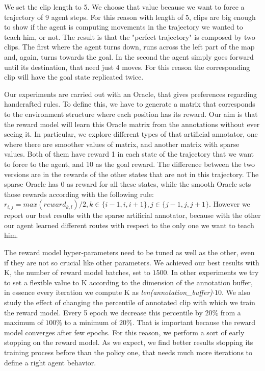 We set the clip length to 5. We choose that value because we want to force a trajectory of 9 agent steps. 
For this reason with length of 5, clips are big enough to show if the agent is computing movements in the trajectory we wanted to teach him, or not. The result is that the "perfect trajectory" is composed by two clips. The first where the agent turns down, runs across the left part of the map and, again, turns towards the goal. In the second the agent simply goes forward until its destination, that need just 4 moves. For this reason the corresponding clip will have the goal state replicated twice. 

Our experiments are carried out with an Oracle, that gives preferences regarding handcrafted rules. To define this, we have to generate a matrix that corresponds to the environment structure where each position has its reward. Our aim is that the reward model will learn this Oracle matrix from the annotations without ever seeing it. In particular, we explore different types of that artificial annotator, one where there are smoother values of matrix, and another matrix with sparse values. Both of them have reward 1 in each state of the trajectory that we want to force to the agent, and 10 as the goal reward. The difference between the two versions are in the rewards of the other states that are not in this trajectory. 
The sparse Oracle has 0 as reward for all these states, while the smooth Oracle sets those rewards according with the following rule: $r_{i,j}=max(reward_{k,l})/2, k\in\{i-1,i,i+1\}, j\in\{j-1,j,j+1\}$. 
However we report our best results with the sparse artificial annotator, because with the other our agent learned different routes with respect to the only one we want to teach him.  

The reward model hyper-parameters need to be tuned as well as the other, even if they are not so crucial like other parameters. We achieved our best results with  K, the number of reward model batches, set to $1500$. In other experiments we try to set a flexible value to K according to the dimension of the annotation buffer, in essence every iteration we compute K as \textit{len(annotation\_buffer)}$\cdot10$. We also study the effect of changing the percentile of annotated clip with which we train the reward model. Every 5 epoch we decrease this percentile by $20\%$ from a maximum of $100\%$ to a minimum of $20\%$. 
That is important because the reward model converges after few epochs. For this reason, we perform a sort of early stopping on the reward model. As we expect, we find better results stopping its training process before than the policy one, that needs much more iterations to define a right agent behavior. 


